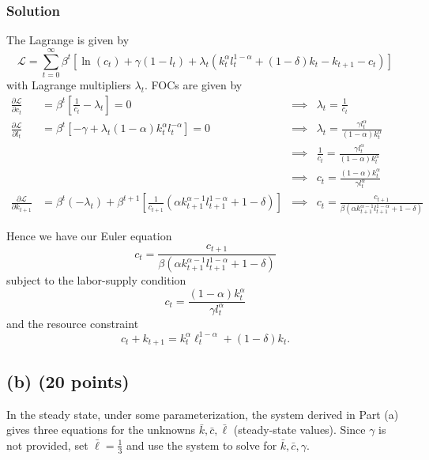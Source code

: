 \documentclass[12pt]{article}
\begin{document}
\subsubsection*{Solution}
The Lagrange is given by 
\[ \mathcal{L} = \sum_{t=0}^\infty \beta^t \left[ \ln(c_t) + \gamma(1- l_t) + \lambda_t \left( k_t^\alpha l_t^{1-\alpha} + (1-\delta) k_t - k_{t+1} - c_t\right) \right]\]
with Lagrange multipliers $\lambda_t.$
FOCs are given by 
\begin{align*}
    \frac{\partial \mathcal{L}}{\partial c_t } &= \beta^t \left[ \frac{1}{c_t} - \lambda_t \right] =0 & \implies & \lambda_t = \frac{1}{c_t} 
    \\ \frac{\partial \mathcal{L}}{\partial l_t } &= \beta^t \left[ -\gamma + \lambda_t (1-\alpha)k_t^\alpha l_t^{-\alpha}\right] =0 &\implies& \lambda_t = \frac{\gamma l_t^{\alpha}}{ (1-\alpha)k_t^\alpha }
    \\ &&\implies& \frac{1}{c_t} = \frac{\gamma l_t^{\alpha}}{ (1-\alpha)k_t^\alpha }
    \\ &&\implies& c_t = \frac{ (1-\alpha)k_t^\alpha }{\gamma l_t^{\alpha}}
    \\ \frac{\partial \mathcal{L}}{\partial k_{t+1} } &= \beta^t(-\lambda_t) + \beta^{t+1} \left[ \frac{1}{c_{t+1}} ( \alpha k_{t+1}^{\alpha-1} l_{t+1}^{1-\alpha} +1-\delta)\right] &\implies& c_t = \frac{c_{t+1} }{ \beta( \alpha k_{t+1}^{\alpha-1} l_{t+1}^{1-\alpha} +1-\delta)}
\end{align*}

Hence we have our Euler equation 
\begin{equation}\label{Euler}
    c_t = \frac{c_{t+1} }{ \beta( \alpha k_{t+1}^{\alpha-1} l_{t+1}^{1-\alpha} +1-\delta)}
\end{equation}
subject to the labor-supply condition
\begin{equation}\label{labor-supply}
    c_t = \frac{ (1-\alpha)k_t^\alpha }{\gamma l_t^{\alpha}}
\end{equation}
and the resource constraint
\begin{equation}\label{resource}
    c_t + k_{t+1} = k_t^\alpha \ell_t^{1-\alpha}  + (1-\delta) k_t.
\end{equation}


\subsection*{(b) (20 points)}
In the steady state, under some parameterization, the system derived in Part (a) gives three equations for the unknowns \( \bar{k}, \bar{c}, \bar{\ell} \) (steady-state values). Since \( \gamma \) is not provided, set \( \bar{\ell} = \frac{1}{3} \) and use the system to solve for \( \bar{k}, \bar{c}, \gamma \).
\end{document}
